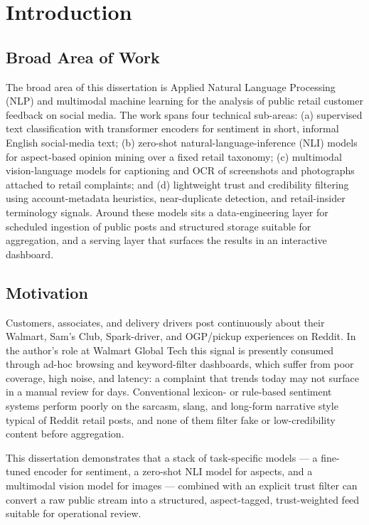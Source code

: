 \chapter{Introduction}\label{ch:intro}

\section{Broad Area of Work}\label{sec:area}
The broad area of this dissertation is Applied Natural Language Processing
(NLP) and multimodal machine learning for the analysis of public retail
customer feedback on social media.  The work spans four technical sub-areas:
(a) supervised text classification with transformer encoders for sentiment
in short, informal English social-media text;
(b) zero-shot natural-language-inference (NLI) models for aspect-based opinion
mining over a fixed retail taxonomy;
(c) multimodal vision-language models for captioning and OCR of screenshots
and photographs attached to retail complaints; and
(d) lightweight trust and credibility filtering using account-metadata
heuristics, near-duplicate detection, and retail-insider terminology signals.
Around these models sits a data-engineering layer for scheduled ingestion of
public posts and structured storage suitable for aggregation, and a serving
layer that surfaces the results in an interactive dashboard.

\section{Motivation}\label{sec:motiv}
Customers, associates, and delivery drivers post continuously about their
Walmart, Sam's Club, Spark-driver, and OGP/pickup experiences on Reddit.  In
the author's role at Walmart Global Tech this signal is presently consumed
through ad-hoc browsing and keyword-filter dashboards, which suffer from poor
coverage, high noise, and latency: a complaint that trends today may not
surface in a manual review for days.  Conventional lexicon- or rule-based
sentiment systems perform poorly on the sarcasm, slang, and long-form
narrative style typical of Reddit retail posts, and none of them filter fake
or low-credibility content before aggregation.

This dissertation demonstrates that a stack of task-specific models --- a
fine-tuned encoder for sentiment, a zero-shot NLI model for aspects, and a
multimodal vision model for images --- combined with an explicit trust filter
can convert a raw public stream into a structured, aspect-tagged,
trust-weighted feed suitable for operational review.

